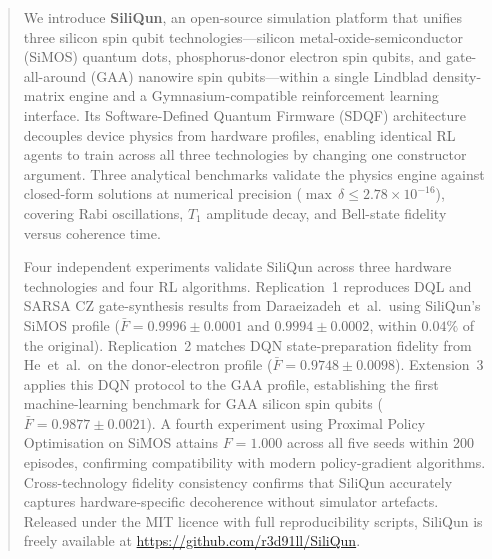 \documentclass{iopjournal}
\begin{document}
\begin{abstract}
We introduce \textbf{SiliQun}, an open-source simulation platform that unifies
three silicon spin qubit technologies---silicon metal-oxide-semiconductor (SiMOS)
quantum dots, phosphorus-donor electron spin qubits, and gate-all-around (GAA)
nanowire spin qubits---within a single Lindblad density-matrix engine and a
Gymnasium-compatible reinforcement learning interface. Its Software-Defined
Quantum Firmware (SDQF) architecture decouples device physics from hardware
profiles, enabling identical RL agents to train across all three technologies
by changing one constructor argument. Three analytical benchmarks validate the
physics engine against closed-form solutions at numerical precision
($\max\,\delta \leq 2.78 \times 10^{-16}$), covering Rabi oscillations,
$T_1$ amplitude decay, and Bell-state fidelity versus coherence time.

Four independent experiments validate SiliQun across three hardware technologies
and four RL algorithms. Replication~1 reproduces DQL and SARSA CZ gate-synthesis
results from Daraeizadeh~et~al.\ using SiliQun's SiMOS profile
($\bar{F} = 0.9996 \pm 0.0001$ and $0.9994 \pm 0.0002$, within $0.04\%$ of the
original). Replication~2 matches DQN state-preparation fidelity from He~et~al.\
on the donor-electron profile ($\bar{F} = 0.9748 \pm 0.0098$). Extension~3
applies this DQN protocol to the GAA profile, establishing the first
machine-learning benchmark for GAA silicon spin qubits
($\bar{F} = 0.9877 \pm 0.0021$). A fourth experiment using Proximal Policy
Optimisation on SiMOS attains $F = 1.000$ across all five seeds within 200
episodes, confirming compatibility with modern policy-gradient algorithms.
Cross-technology fidelity consistency confirms that SiliQun accurately captures
hardware-specific decoherence without simulator artefacts. Released under the
MIT licence with full reproducibility scripts, SiliQun is freely available at
\url{https://github.com/r3d91ll/SiliQun}.
\end{abstract}








\end{document}
